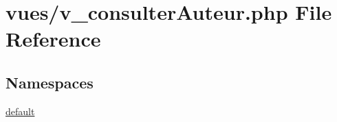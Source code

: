 \hypertarget{v__consulter_auteur_8php}{}\section{vues/v\+\_\+consulter\+Auteur.php File Reference}
\label{v__consulter_auteur_8php}
\subsection*{Namespaces}
\begin{DoxyCompactItemize}
\item 
 \hyperlink{namespacedefault}{default}
\end{DoxyCompactItemize}
